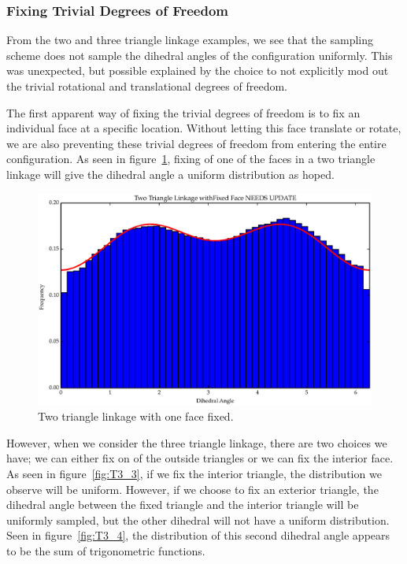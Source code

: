 \subsubsection{Fixing Trivial Degrees of Freedom}
From the two and three triangle linkage examples, we see that the sampling scheme does not sample the dihedral angles of the configuration uniformly. This was unexpected, but possible explained by the choice to not explicitly mod out the trivial rotational and translational degrees of freedom. 

The first apparent way of fixing the trivial degrees of freedom is to fix an individual face at a specific location. Without letting this face translate or rotate, we are also preventing these trivial degrees of freedom from entering the entire configuration. As seen in figure~\ref{fig:T2_3}, fixing of one of the faces in a two triangle linkage will give the dihedral angle a uniform distribution as hoped. 
\begin{figure}[ht]
\centering
  \includegraphics[scale=0.6]{images/T2_3.eps}
\caption{Two triangle linkage with one face fixed.}
\label{fig:T2_3}
\end{figure}
However, when we consider the three triangle linkage, there are two choices we have; we can either fix on of the outside triangles or we can fix the interior face. As seen in figure~\ref{fig:T3_3}, if we fix the interior triangle, the distribution we observe will be uniform. However, if we choose to fix an exterior triangle, the dihedral angle between the fixed triangle and the interior triangle  will be uniformly sampled, but the other dihedral will not have a uniform distribution. Seen in figure~\ref{fig:T3_4}, the distribution of this second dihedral angle appears to be the sum of trigonometric functions.
